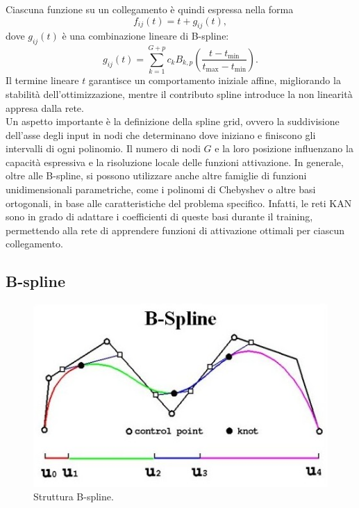 \documentclass[a4paper,12pt]{report}
\begin{document}
	Ciascuna funzione su un collegamento è quindi espressa nella forma
	\[
	f_{ij}(t) = t + g_{ij}(t),
	\]
	dove \(g_{ij}(t)\) è una combinazione lineare di B-spline:
	\[
	g_{ij}(t) = \sum_{k=1}^{G+p} c_k B_{k,p}\left(\frac{t - t_{\min}}{t_{\max} - t_{\min}}\right).
	\]
	Il termine lineare \(t\) garantisce un comportamento iniziale affine, migliorando la stabilità dell'ottimizzazione, mentre il contributo spline introduce la non linearità appresa dalla rete. \\
	
	Un aspetto importante è la definizione della spline grid, ovvero la suddivisione dell'asse degli input in nodi che determinano dove iniziano e finiscono gli intervalli di ogni polinomio. Il numero di nodi \(G\) e la loro posizione influenzano la capacità espressiva e la risoluzione locale delle funzioni attivazione. In generale, oltre alle B-spline, si possono utilizzare anche altre famiglie di funzioni unidimensionali parametriche, come i polinomi di Chebyshev o altre basi ortogonali, in base alle caratteristiche del problema specifico. Infatti, le reti KAN sono in grado di adattare i coefficienti di queste basi durante il training, permettendo alla rete di apprendere funzioni di attivazione ottimali per ciascun collegamento.
	
	\subsection{B-spline}
	
	\begin{figure}[H]
		\centering
		\includegraphics[width=1.0\textwidth]{img/b_spline.jpg}
		\caption{Struttura B-spline.}
	\end{figure}
	
\end{document}
